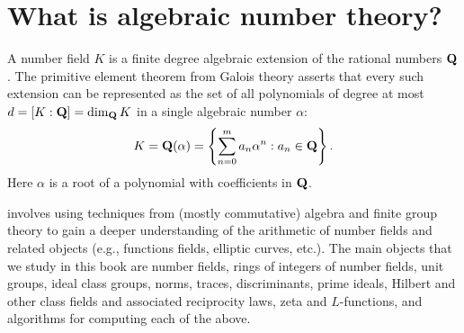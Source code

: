 \section{What is algebraic number theory?}
A number field $K$ is a finite degree algebraic extension of the rational
numbers $\mathbf{Q}$.  The primitive element theorem from Galois theory
asserts that every such extension can be represented as the set of all
polynomials of degree at most $d = [K:\mathbf{Q}] = \dim_{\mathbf{Q}} K$ 
in a single algebraic number $\alpha$:
$$
 K = \mathbf{Q}(\alpha) = \left\{ \sum_{n=0}^{m} a_n \alpha^n : a_n\in\mathbf{Q} \right\}.
$$ 
Here $\alpha$ is a root of a polynomial with coefficients in $\mathbf{Q}$.
\begin{comment}
Note that
$\Q(\alpha)$ is non-canonically isomorphic to $\Q[x]/(f)$, where $f$
is the minimal polynomial of~$\alpha$.  The isomorphism is induced by
the homomorphism $\Q[x]\to\Q(\alpha)$ that sends~$x$ to~$\alpha$,
which has kernel~$(f)$.  It is not canonical, since $\Q(\alpha)$ could
have nontrivial automorphisms.  For example, if $\alpha=\sqrt{2}$, then
$\Q(\sqrt{2})$ is isomorphic as a field to $\Q(-\sqrt{2})$ via
$\sqrt{2}\mapsto -\sqrt{2}$.  There are two isomorphisms
$\Q[x]/(x^2-2)\to \Q(\sqrt{2})$.
\end{comment}

 involves using techniques from (mostly
commutative) algebra and finite group theory to gain a deeper
understanding of the arithmetic of number fields and related objects
(e.g., functions fields, elliptic curves, etc.).  The main objects that we
study in this book are number fields, rings of integers
of number fields, unit groups, ideal class groups, norms, traces,
discriminants, prime ideals, Hilbert and other class fields and
associated reciprocity laws, zeta and $L$-functions, and algorithms
for computing each of the above.

